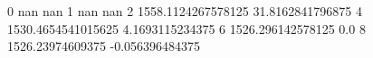 0 nan nan
1 nan nan
2 1558.1124267578125 31.8162841796875
4 1530.4654541015625 4.1693115234375
6 1526.296142578125 0.0
8 1526.23974609375 -0.056396484375
